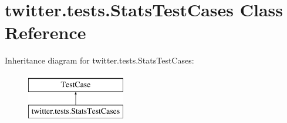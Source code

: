 \hypertarget{classtwitter_1_1tests_1_1_stats_test_cases}{}\section{twitter.\+tests.\+Stats\+Test\+Cases Class Reference}
\label{classtwitter_1_1tests_1_1_stats_test_cases}
Inheritance diagram for twitter.\+tests.\+Stats\+Test\+Cases\+:\begin{figure}[H]
\begin{center}
\leavevmode
\includegraphics[height=2.000000cm]{classtwitter_1_1tests_1_1_stats_test_cases}
\end{center}
\end{figure}
